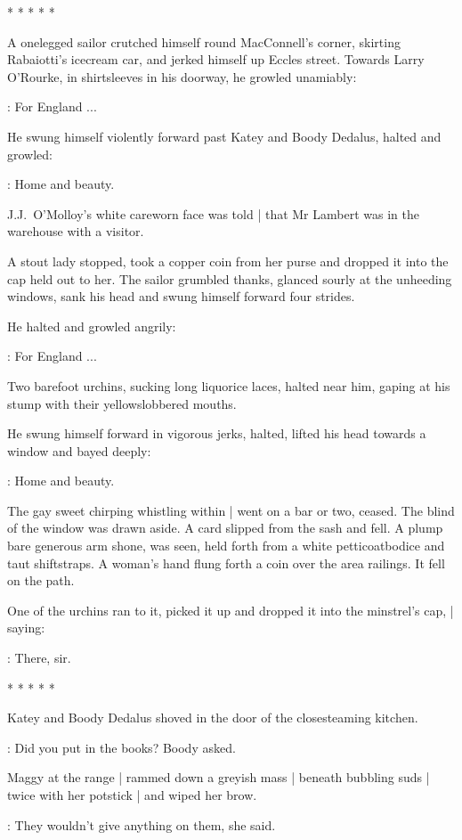     * * * * *


A onelegged sailor crutched himself round MacConnell's corner,
skirting Rabaiotti's icecream car,
and jerked himself up Eccles street.
Towards Larry O'Rourke,
in shirtsleeves in his doorway,
he growled unamiably:

\sailor:
For England ...

He swung himself violently forward past Katey and Boody Dedalus,
halted and growled:

\sailor:
Home and beauty.

J.J.~O'Molloy's white careworn face was told |
that Mr Lambert was in the warehouse with a visitor.

A stout lady stopped,
took a copper coin from her purse
and dropped it into the cap held out to her.
The sailor grumbled thanks,
glanced sourly at the unheeding windows,
sank his head
and swung himself forward four strides.

He halted and growled angrily:

\sailor:
For England ...

Two barefoot urchins,
sucking long liquorice laces,
halted near him,
gaping at his stump with their yellowslobbered mouths.

He swung himself forward in vigorous jerks,
halted,
lifted his head towards a window
and bayed deeply:

\sailor:
Home and beauty.

The gay sweet chirping whistling within |
went on a bar or two, ceased.
The blind of the window was drawn aside.
A card 
slipped from the sash and fell.
A plump bare generous arm shone,
was seen,
held forth from a white petticoatbodice and taut shiftstraps.
A woman's hand flung forth a coin
over the area railings.
It fell on the path.

One of the urchins ran to it,
picked it up and dropped it into the minstrel's cap, |
saying:

:
There, sir.


    * * * * *


Katey and Boody Dedalus shoved in the door of the closesteaming kitchen.

\boody:
Did you put in the books?
Boody asked.

Maggy at the range |
rammed down a greyish mass |
beneath bubbling suds |
twice with her potstick |
and wiped her brow.

\maggy:
They wouldn't give anything on them,
she said.

